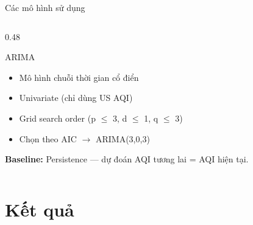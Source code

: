 \documentclass[aspectratio=169]{beamer}
\begin{document}
\begin{frame}{Các mô hình sử dụng}
\begin{columns}[T]
\begin{column}{0.48\textwidth}
      \vspace{0.3em}
      \begin{block}{ARIMA}
        \begin{itemize}\small
          \item Mô hình chuỗi thời gian cổ điển
          \item Univariate (chỉ dùng US AQI)
          \item Grid search order (p $\leq$ 3, d $\leq$ 1, q $\leq$ 3)
          \item Chọn theo AIC $\to$ ARIMA(3,0,3)
        \end{itemize}
      \end{block}
      \vspace{0.3em}
      \textbf{Baseline:} Persistence --- dự đoán AQI tương lai = AQI hiện tại.
    \end{column}
  \end{columns}
\end{frame}

\section{Kết quả}
\end{document}
